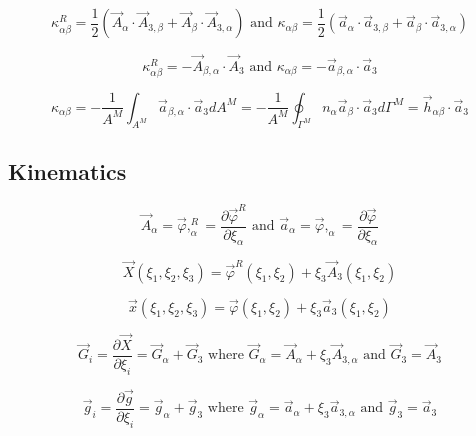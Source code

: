 \documentclass[12pt]{article}
\begin{document}
\begin{equation}
\kappa^R_{\alpha\beta} = \frac{1}{2}(\vec{A}_{\alpha}\cdot\vec{A}_{3,\beta}
 + \vec{A}_{\beta}\cdot\vec{A}_{3,\alpha}) \mbox{ and }
\kappa_{\alpha\beta} = \frac{1}{2}(\vec{a}_{\alpha}\cdot\vec{a}_{3,\beta}
 + \vec{a}_{\beta}\cdot\vec{a}_{3,\alpha})
\end{equation}

\begin{equation}
\kappa^R_{\alpha\beta} = - \vec{A}_{\beta,\alpha}\cdot\vec{A}_{3} \mbox{ and }
\kappa_{\alpha\beta} = - \vec{a}_{\beta,\alpha}\cdot\vec{a}_{3}
\end{equation}

\begin{equation}
\kappa_{\alpha\beta} = - \frac{1}{A^M} \int_{A^M} 
\vec{a}_{\beta,\alpha}\cdot\vec{a}_3 dA^M
 = - \frac{1}{A^M} \oint_{\Gamma^M} 
n_{\alpha}\vec{a}_{\beta}\cdot\vec{a}_3 d\Gamma^M
 = \vec{h}_{\alpha\beta}\cdot\vec{a}_3
\end{equation}

%
\subsection{Kinematics}
%
\begin{equation}
\vec{A}_{\alpha} = \vec{\varphi},^R_{\alpha}
 = \frac{\partial \vec{\varphi}^R}{\partial \xi_{\alpha}}
\mbox{ and }
\vec{a}_{\alpha} = \vec{\varphi},_{\alpha}
 = \frac{\partial \vec{\varphi}}{\partial \xi_{\alpha}}
\end{equation}

\begin{equation}
\vec{X}(\xi_1,\xi_2,\xi_3) = \vec{\varphi}^R(\xi_1,\xi_2)
 + \xi_3\vec{A}_3(\xi_1,\xi_2)
\end{equation}

\begin{equation}
\vec{x}(\xi_1,\xi_2,\xi_3) = \vec{\varphi}(\xi_1,\xi_2)
 + \xi_3\vec{a}_3(\xi_1,\xi_2)
\end{equation}

\begin{equation}
\vec{G}_i = \frac{\partial \vec{X}}{\partial \xi_i} = \vec{G}_{\alpha} + \vec{G}_3
\mbox{ where }
\vec{G}_{\alpha} = \vec{A}_{\alpha} + \xi_3\vec{A}_{3,\alpha}
\mbox{ and }
\vec{G}_3 = \vec{A}_3
\end{equation}

\begin{equation}
\vec{g}_i = \frac{\partial \vec{g}}{\partial \xi_i} = \vec{g}_{\alpha} + \vec{g}_3
\mbox{ where }
\vec{g}_{\alpha} = \vec{a}_{\alpha} + \xi_3\vec{a}_{3,\alpha}
\mbox{ and }
\vec{g}_3 = \vec{a}_3
\end{equation}
\end{document}
